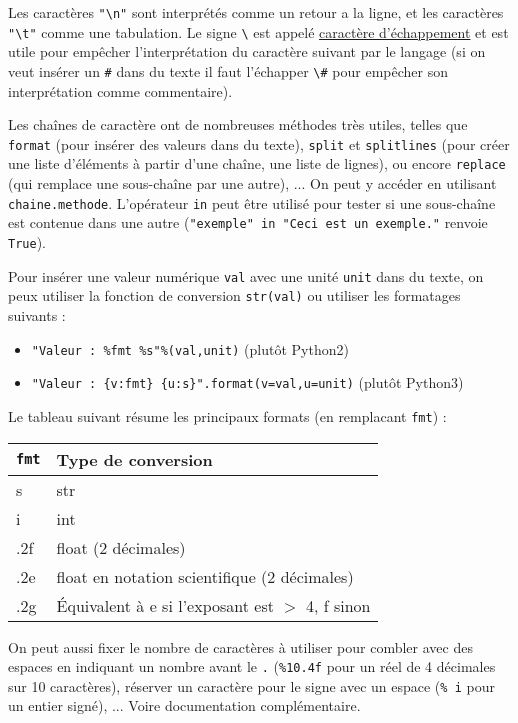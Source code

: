 \documentclass{article}
\begin{document}
Les caractères \texttt{"\textbackslash n"} sont interprétés comme un retour a la ligne, et les caractères \texttt{"\textbackslash t"} comme une tabulation. Le signe \texttt{\textbackslash} est appelé \href{https://fr.wikipedia.org/wiki/Caract\%C3\%A8re_d\%27\%C3\%A9chappement}{caractère d'échappement} et est utile pour empêcher l'interprétation du caractère suivant par le langage (si on veut insérer un \texttt{\#} dans du texte il faut l'échapper \texttt{\textbackslash \#} pour empêcher son interprétation comme commentaire).

Les chaînes de caractère ont de nombreuses méthodes très utiles, telles que \texttt{format} (pour insérer des valeurs dans du texte), \texttt{split} et \texttt{splitlines} (pour créer une liste d'éléments à partir d'une chaîne, une liste de lignes), ou encore \texttt{replace} (qui remplace une sous-chaîne par une autre), ... On peut y accéder en utilisant \texttt{chaine.methode}. L'opérateur \texttt{in} peut être utilisé pour tester si une sous-chaîne est contenue dans une autre (\texttt{"exemple" in "Ceci est un exemple."} renvoie \texttt{True}).

Pour insérer une valeur numérique \texttt{val} avec une unité \texttt{unit} dans du texte, on peux utiliser la fonction de conversion \texttt{str(val)} ou utiliser les formatages suivants :
\begin{itemize}
    \item \texttt{"Valeur : \%fmt \%s"\%(val,unit)} (plutôt Python2) 
    \item \texttt{"Valeur : \{v:fmt\} \{u:s\}".format(v=val,u=unit)} (plutôt Python3)
\end{itemize}

Le tableau suivant résume les principaux formats (en remplacant \texttt{fmt}) :

\begin{tabular}{|l|l|}
    \hline
    \texttt{fmt}    & Type de conversion\\
    \hline
    s               & str\\
    i               & int\\
    .2f             & float (2 décimales)\\
    .2e             & float en notation scientifique (2 décimales)\\
    .2g             & Équivalent à e si l'exposant est $>$ 4, f sinon\\
    \hline
\end{tabular}

On peut aussi fixer le nombre de caractères à utiliser pour combler avec des espaces en indiquant un nombre avant le \texttt{.} (\texttt{\%10.4f} pour un réel de 4 décimales sur 10 caractères), réserver un caractère pour le signe avec un espace (\texttt{\% i} pour un entier signé), ... Voire documentation complémentaire.
\end{document}
